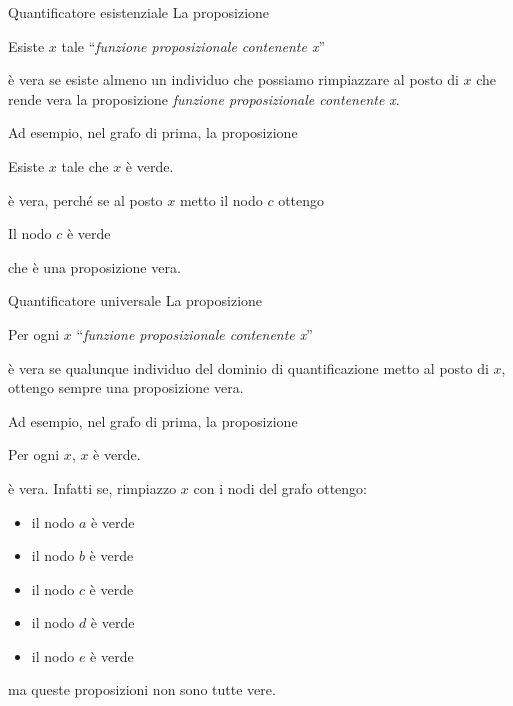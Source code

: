 \documentclass[aspectratio=169,10pt,dvipsnames]{beamer}
\begin{document}
\begin{frame}{Quantificatore esistenziale}
	La proposizione
	\begin{center}
		Esiste $x$ tale ``\emph{funzione proposizionale contenente x}''
	\end{center}
	è vera se esiste almeno un individuo che possiamo rimpiazzare al posto di $x$ che rende vera la proposizione \emph{funzione proposizionale contenente x}.

	\pause \medskip
	Ad esempio, nel grafo di prima, la proposizione
	\begin{center}
		Esiste $x$ tale che $x$ è verde.
	\end{center}
	è vera, perché se al posto $x$ metto il nodo $c$ ottengo
	\begin{center}
		Il nodo $c$ è verde
	\end{center}
	che è una proposizione vera.
\end{frame}


\begin{frame}{Quantificatore universale}
	La proposizione
	\begin{center}
		Per ogni $x$ ``\emph{funzione proposizionale contenente x}''
	\end{center}
	è vera se qualunque individuo del dominio di quantificazione metto al posto di $x$, ottengo sempre una proposizione vera.

	\pause \medskip
	Ad esempio, nel grafo di prima, la proposizione
	\begin{center}
		Per ogni $x$, $x$ è verde.
	\end{center}
	è vera. Infatti se, rimpiazzo $x$ con i nodi del grafo ottengo:
	\begin{itemize}
		\item il nodo $a$ è verde
		\item il nodo $b$ è verde
		\item il nodo $c$ è verde
		\item il nodo $d$ è verde
		\item il nodo $e$ è verde
	\end{itemize}
	ma queste proposizioni non sono tutte vere.
\end{frame}
\end{document}

